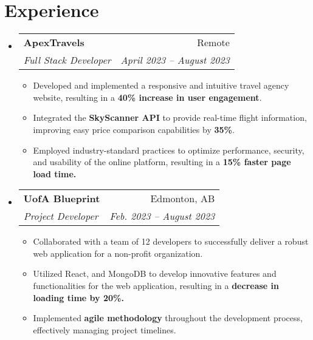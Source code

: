 \documentclass[letterpaper,10pt]{article}
\makeatletter
\newcommand{\resumeItem}[1]{
  \item\normalsize{
    {#1 \vspace{-2pt}}
  }
}
\newcommand{\resumeSubheading}[4]{
  \vspace{-2pt}\item
    \begin{tabular*}{0.97\textwidth}[t]{l@{\extracolsep{\fill}}r}
      \textbf{#1} & #2 \\
      \textit{\small#3} & \textit{\small #4} \\
    \end{tabular*}\vspace{-7pt}
}
\newcommand{\resumeSubHeadingListStart}{\begin{itemize}[leftmargin=0.15in, label={}]}
\newcommand{\resumeSubHeadingListEnd}{\end{itemize}}
\newcommand{\resumeItemListStart}{\begin{itemize}}
\newcommand{\resumeItemListEnd}{\end{itemize}\vspace{-5pt}}
\makeatother
\begin{document}
\vspace{-10pt}
\section{\LARGE Experience}
  \resumeSubHeadingListStart
  
      \resumeSubheading
      {\large \faCodeFork \hspace{1pt} ApexTravels}{\large Remote}
      {\normalsize{Full Stack Developer}}{\normalsize{April 2023 -- August 2023}}
      \vspace{1pt}
      \resumeItemListStart
        \resumeItem{Developed and implemented a responsive and intuitive travel agency website, resulting in a \textbf{40\% increase in user engagement}.}
        \resumeItem{Integrated the \textbf{SkyScanner API} to provide real-time flight information, improving easy price comparison capabilities by \textbf{35\%}.}
        \resumeItem{Employed industry-standard practices to optimize performance, security, and usability of the online platform, resulting in a \textbf{15\% faster page load time.}}
      \resumeItemListEnd
      \vspace{5pt}
      \resumeSubheading
      {\large \faCodeFork \hspace{1pt} UofA Blueprint}{\large Edmonton, AB}
      {\normalsize{Project Developer}}{\normalsize{Feb. 2023 -- August 2023}}
      \vspace{1pt}
      \resumeItemListStart
        \resumeItem{Collaborated with a team of 12 developers to successfully deliver a robust web application for a non-profit organization.}
        \resumeItem{Utilized React, and MongoDB to develop innovative features and functionalities for the web application, resulting in a \textbf{decrease in loading time by 20\%.}}
        \resumeItem{Implemented \textbf{agile methodology} throughout the development process, effectively managing project timelines.}
      \resumeItemListEnd


  \resumeSubHeadingListEnd
  


\vspace{-10pt}
\end{document}
